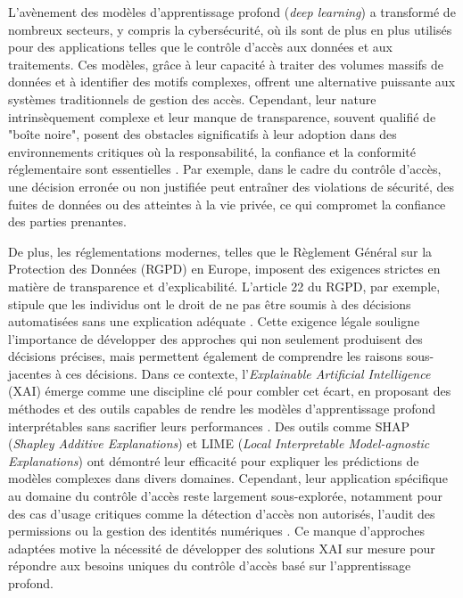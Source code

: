 


L'avènement des modèles d'apprentissage profond (\textit{deep learning}) a transformé de nombreux secteurs, y compris la cybersécurité, où ils sont de plus en plus utilisés pour des applications telles que le contrôle d'accès aux données et aux traitements. Ces modèles, grâce à leur capacité à traiter des volumes massifs de données et à identifier des motifs complexes, offrent une alternative puissante aux systèmes traditionnels de gestion des accès. Cependant, leur nature intrinsèquement complexe et leur manque de transparence, souvent qualifié de "boîte noire", posent des obstacles significatifs à leur adoption dans des environnements critiques où la responsabilité, la confiance et la conformité réglementaire sont essentielles \cite{zhang2022xai}. Par exemple, dans le cadre du contrôle d'accès, une décision erronée ou non justifiée peut entraîner des violations de sécurité, des fuites de données ou des atteintes à la vie privée, ce qui compromet la confiance des parties prenantes.

De plus, les réglementations modernes, telles que le Règlement Général sur la Protection des Données (RGPD) en Europe, imposent des exigences strictes en matière de transparence et d'explicabilité. L'article 22 du RGPD, par exemple, stipule que les individus ont le droit de ne pas être soumis à des décisions automatisées sans une explication adéquate \cite{goodman2017gdpr}. Cette exigence légale souligne l'importance de développer des approches qui non seulement produisent des décisions précises, mais permettent également de comprendre les raisons sous-jacentes à ces décisions. Dans ce contexte, l'\textit{Explainable Artificial Intelligence} (XAI) émerge comme une discipline clé pour combler cet écart, en proposant des méthodes et des outils capables de rendre les modèles d'apprentissage profond interprétables sans sacrifier leurs performances \cite{barredo2020xai}. Des outils comme SHAP (\textit{Shapley Additive Explanations}) \cite{lundberg2017shap} et LIME (\textit{Local Interpretable Model-agnostic Explanations}) \cite{ribeiro2016lime} ont démontré leur efficacité pour expliquer les prédictions de modèles complexes dans divers domaines. Cependant, leur application spécifique au domaine du contrôle d'accès reste largement sous-explorée, notamment pour des cas d'usage critiques comme la détection d'accès non autorisés, l'audit des permissions ou la gestion des identités numériques \cite{ahmed2021xai}. Ce manque d'approches adaptées motive la nécessité de développer des solutions XAI sur mesure pour répondre aux besoins uniques du contrôle d'accès basé sur l'apprentissage profond.




